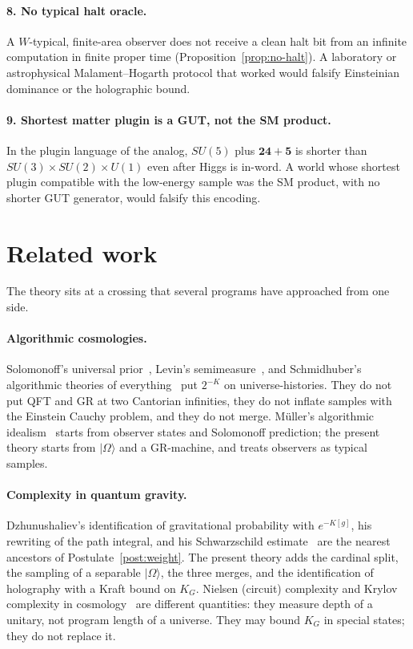 \documentclass[11pt,a4paper]{article}
\theoremstyle{plain}
\theoremstyle{definition}
\theoremstyle{remark}
\newcommand{\KG}{K_{G}}
\newcommand{\ket}[1]{\lvert#1\rangle}
\begin{document}
\paragraph{8. No typical halt oracle.}
A $W$-typical, finite-area observer does not receive a clean halt bit from an infinite computation in finite proper time (Proposition~\ref{prop:no-halt}).
A laboratory or astrophysical Malament--Hogarth protocol that worked would falsify Einsteinian dominance or the holographic bound.

\paragraph{9. Shortest matter plugin is a GUT, not the SM product.}
In the plugin language of the analog, $SU(5)$ plus $\mathbf{24}+\mathbf{5}$ is shorter than $SU(3)\times SU(2)\times U(1)$ even after Higgs is in-word.
A world whose shortest plugin compatible with the low-energy sample was the SM product, with no shorter GUT generator, would falsify this encoding.

\section{Related work}

The theory sits at a crossing that several programs have approached from one side.

\paragraph{Algorithmic cosmologies.}
Solomonoff's universal prior~\cite{solomonoff1964}, Levin's semimeasure~\cite{levin1974}, and Schmidhuber's algorithmic theories of everything~\cite{schmidhuber2000} put $2^{-K}$ on universe-histories.
They do not put QFT and GR at two Cantorian infinities, they do not inflate samples with the Einstein Cauchy problem, and they do not merge.
M\"uller's algorithmic idealism~\cite{mueller2017,mueller2024} starts from observer states and Solomonoff prediction; the present theory starts from $\ket{\Omega}$ and a GR-machine, and treats observers as typical samples.

\paragraph{Complexity in quantum gravity.}
Dzhunushaliev's identification of gravitational probability with $e^{-K[g]}$, his rewriting of the path integral, and his Schwarzschild estimate~\cite{dzhunushaliev1998,dzhunushaliev2002} are the nearest ancestors of Postulate~\ref{post:weight}.
The present theory adds the cardinal split, the sampling of a separable $\ket{\Omega}$, the three merges, and the identification of holography with a Kraft bound on $\KG$.
Nielsen (circuit) complexity and Krylov complexity in cosmology~\cite{bhattacharyya2020,nielsen2006} are different quantities: they measure depth of a unitary, not program length of a universe.
They may bound $\KG$ in special states; they do not replace it.
\end{document}
